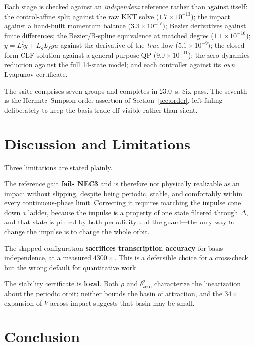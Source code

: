 \documentclass[10pt,conference]{IEEEtran}
\begin{document}
Each stage is checked against an \emph{independent} reference rather than
against itself: the control-affine split against the raw KKT solve
($1.7\times10^{-13}$); the impact against a hand-built momentum balance
($3.3\times10^{-16}$); Bezier derivatives against finite differences; the
Bezier/B-spline equivalence at matched degree ($1.1\times10^{-16}$);
$\ddot y = L_f^2y + L_gL_fyu$ against the derivative of the \emph{true} flow
($5.1\times10^{-9}$); the closed-form CLF solution against a general-purpose QP
($9.0\times10^{-11}$); the zero-dynamics reduction against the full 14-state
model; and each controller against its \emph{own} Lyapunov certificate.

The suite comprises seven groups and completes in 23.0~s. Six pass. The seventh
is the Hermite--Simpson order assertion of Section~\ref{sec:order}, left failing
deliberately to keep the basis trade-off visible rather than silent.

\section{Discussion and Limitations}

Three limitations are stated plainly.

The reference gait \textbf{fails NEC3} and is therefore not physically
realizable as an impact without slipping, despite being periodic, stable, and
comfortably within every continuous-phase limit. Correcting it requires marching
the impulse cone down a ladder, because the impulse is a property of one state
filtered through $\Delta$, and that state is pinned by both periodicity and the
guard---the only way to change the impulse is to change the whole orbit.

The shipped configuration \textbf{sacrifices transcription accuracy} for basis
independence, at a measured $4300\times$. This is a defensible choice for a
cross-check but the wrong default for quantitative work.

The stability certificate is \textbf{local}. Both $\rho$ and
$\delta^2_{\mathrm{zero}}$ characterize the linearization about the periodic
orbit; neither bounds the basin of attraction, and the $34\times$ expansion of
$V$ across impact suggests that basin may be small.

\section{Conclusion}
\end{document}
